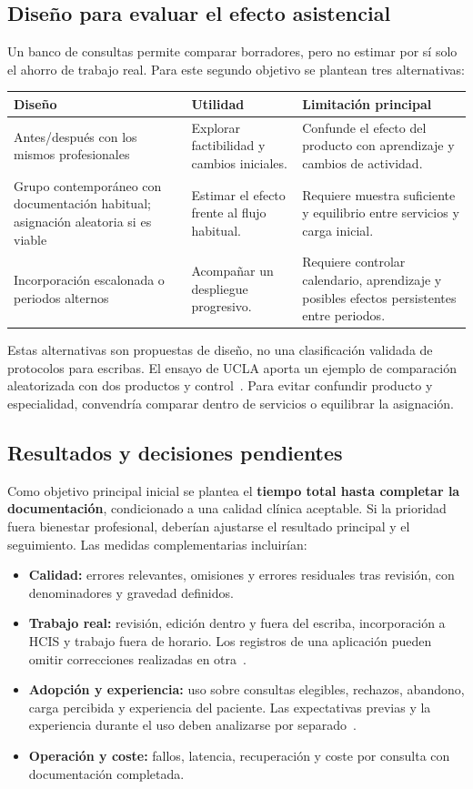 \subsection{Diseño para evaluar el efecto asistencial}
Un banco de consultas permite comparar borradores, pero no estimar por sí solo el ahorro de trabajo real. Para este segundo objetivo se plantean tres alternativas:
\begin{small}
\begin{longtable}{L{.25\linewidth}L{.31\linewidth}L{.34\linewidth}}
\toprule
Diseño & Utilidad & Limitación principal \\
\midrule\endhead
Antes/después con los mismos profesionales & Explorar factibilidad y cambios iniciales. & Confunde el efecto del producto con aprendizaje y cambios de actividad. \\
Grupo contemporáneo con documentación habitual; asignación aleatoria si es viable & Estimar el efecto frente al flujo habitual. & Requiere muestra suficiente y equilibrio entre servicios y carga inicial. \\
Incorporación escalonada o periodos alternos & Acompañar un despliegue progresivo. & Requiere controlar calendario, aprendizaje y posibles efectos persistentes entre periodos. \\
\bottomrule
\end{longtable}
\end{small}
Estas alternativas son propuestas de diseño, no una clasificación validada de protocolos para escribas. El ensayo de UCLA aporta un ejemplo de comparación aleatorizada con dos productos y control~\cite{PR93N8FN}. Para evitar confundir producto y especialidad, convendría comparar dentro de servicios o equilibrar la asignación.

\clearpage
\subsection{Resultados y decisiones pendientes}
Como objetivo principal inicial se plantea el \textbf{tiempo total hasta completar la documentación}, condicionado a una calidad clínica aceptable. Si la prioridad fuera bienestar profesional, deberían ajustarse el resultado principal y el seguimiento. Las medidas complementarias incluirían:
\begin{itemize}
\item \textbf{Calidad:} errores relevantes, omisiones y errores residuales tras revisión, con denominadores y gravedad definidos.
\item \textbf{Trabajo real:} revisión, edición dentro y fuera del escriba, incorporación a HCIS y trabajo fuera de horario. Los registros de una aplicación pueden omitir correcciones realizadas en otra~\cite{C7S8N9NA}.
\item \textbf{Adopción y experiencia:} uso sobre consultas elegibles, rechazos, abandono, carga percibida y experiencia del paciente. Las expectativas previas y la experiencia durante el uso deben analizarse por separado~\cite{PR93N8FN,54NFKG36}.
\item \textbf{Operación y coste:} fallos, latencia, recuperación y coste por consulta con documentación completada.
\end{itemize}

